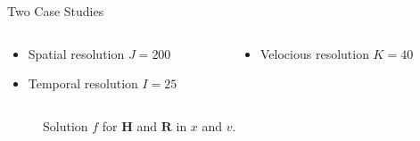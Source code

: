 \documentclass[usenames,dvipsnames,Nike]{tuberlinbeamer}
\begin{document}
\begin{frame}[fragile]{Two Case Studies}
	\begin{columns}
		\begin{column}{.5\textwidth}

			\begin{itemize}
				\item Spatial resolution $J = 200$
				\item Temporal resolution $I = 25$
			\end{itemize}
		\end{column}
		\begin{column}{.5\textwidth}
			\begin{itemize}
				\item Velocious resolution $K = 40$
			\end{itemize}
		\end{column}
	\end{columns}
	\begin{figure}
		 
		 \caption{Solution $f$ for $\mathbf{H}$ and $\mathbf{R}$ in $x$ and $v$.}
	\end{figure}
\end{frame}
\end{document}
